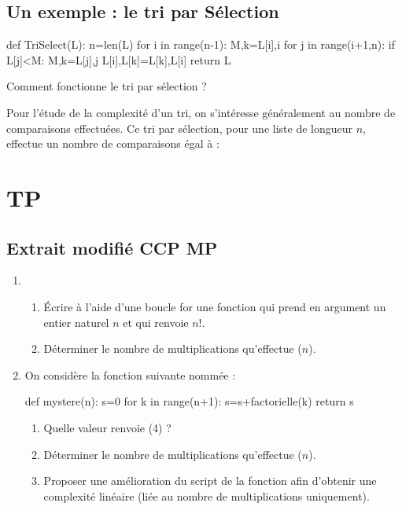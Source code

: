 \documentclass[french,11pt,twoside]{VcCours}
\begin{document}
\vspace{3cm}



\subsection{Un exemple : le tri par Sélection}

\begin{Python}
def TriSelect(L):
    n=len(L)
    for i in range(n-1):
        M,k=L[i],i
        for j in range(i+1,n):
            if L[j]<M:
                M,k=L[j],j
        L[i],L[k]=L[k],L[i]
    return L
\end{Python} 
Comment fonctionne le tri par sélection ?

\vspace{3cm}

Pour l'étude de la complexité d'un tri, on s'intéresse généralement au nombre de comparaisons effectuées. Ce tri par sélection, pour une liste de longueur $n$, effectue un nombre de comparaisons égal à :

\vspace*{3cm}

\newpage
\section{TP}
\subsection{Extrait modifié CCP MP}

\begin{enumerate}
\item
\begin{enumerate}
\item Écrire à l'aide d'une boucle for une fonction  qui prend en argument un entier naturel $n$ et qui renvoie $n!$.
\item Déterminer le nombre de multiplications qu'effectue ($n$).
\end{enumerate}
\item On considère la fonction suivante nommée  :
\begin{Python}
def mystere(n):
    s=0
    for k in range(n+1):
        s=s+factorielle(k)
    return s
\end{Python} 
\begin{enumerate}
\item Quelle valeur renvoie (4) ?
\item Déterminer le nombre de multiplications qu'effectue ($n$).
\item Proposer une amélioration du script de la fonction  afin d'obtenir une complexité linéaire (liée au nombre de multiplications uniquement).
\end{enumerate}
\end{enumerate}
\end{document}
